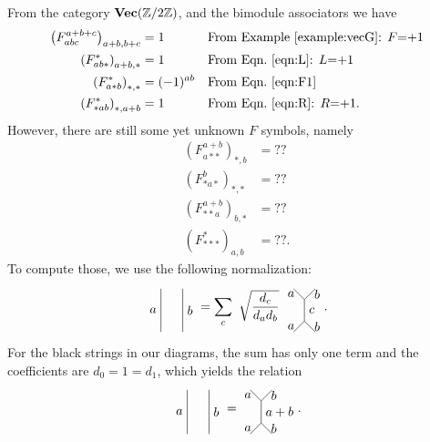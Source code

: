 From the category $\textbf{Vec}(\mathbb{Z}/2\mathbb{Z})$, and the bimodule associators we have
\begin{align}
\left(F_{abc}^{a+b+c}\right)_{a+b,b+c}&=1&&\text{From Example~\ref{example:vecG}: $F$=+1}\\
\left(F_{ab*}^*\right)_{a+b,*}&=1&&\text{From Eqn.~\ref{eqn:L}: $L$=+1} \\
\left(F_{a*b}^*\right)_{*,*}&=(-1)^{ab}&&\text{From Eqn.~\ref{eqn:F1}} \\
\left(F_{*ab}^*\right)_{*,a+b}&=1&&\text{From Eqn.~\ref{eqn:R}: $R$=+1}.
\end{align}
\noindent
However, there are still some yet unknown $F$ symbols, namely
\begin{align}
	\left(F_{a**}^{a+b}\right)_{*,b}&=??\\
	\left(F_{*a*}^b\right)_{*,*}&=??\\
	\left(F_{**a}^{a+b}\right)_{b,*}&=??\\
	\left(F_{***}^*\right)_{a,b}&=??.
\end{align}
\noindent	
To compute those, we use the following normalization\cite{Bonderson,BSS08}:
	\begin{equation}
		\begin{tikzpicture}[scale=1.2,baseline=(current bounding box.center)]
			\draw (0,0) to node [left] {$a$} (0,1);
			\draw (0.5,0) to node [right] {$b$} (0.5,1);
		\end{tikzpicture}=\sum_c\ \sqrt{\frac{d_c}{d_a d_b}}\ 
		\begin{tikzpicture}[scale=1.2,baseline=(current bounding box.center)]
			\draw (0,0) to node [left] {$a$} (0.25,0.25);
			\draw (0.5,0) to node [right] {$b$} (0.25,0.25);
			\draw (0,1) to node [left] {$a$} (0.25,0.75);
			\draw (0.5,1) to node [right] {$b$} (0.25,0.75);
			\draw (0.25,0.25) to node [right] {$c$} (0.25,0.75);
		\end{tikzpicture}.
	\end{equation}
For the black strings in our diagrams, the sum has only one term and the coefficients are $d_0=1=d_1$, which yields the relation
	\begin{equation}
	\label{eq:completeness}
		\begin{tikzpicture}[scale=1.2,baseline=(current bounding box.center)]
			\draw (0,0) to node [left] {$a$} (0,1);
			\draw (0.5,0) to node [right] {$b$} (0.5,1);
		\end{tikzpicture}=
		\begin{tikzpicture}[scale=1.2,baseline=(current bounding box.center)]
			\draw (0,0) to node [left] {$a$} (0.25,0.25);
			\draw (0.5,0) to node [right] {$b$} (0.25,0.25);
			\draw (0,1) to node [left] {$a$} (0.25,0.75);
			\draw (0.5,1) to node [right] {$b$} (0.25,0.75);
			\draw (0.25,0.25) to node [right] {$a+b$} (0.25,0.75);
		\end{tikzpicture}.
	\end{equation}
